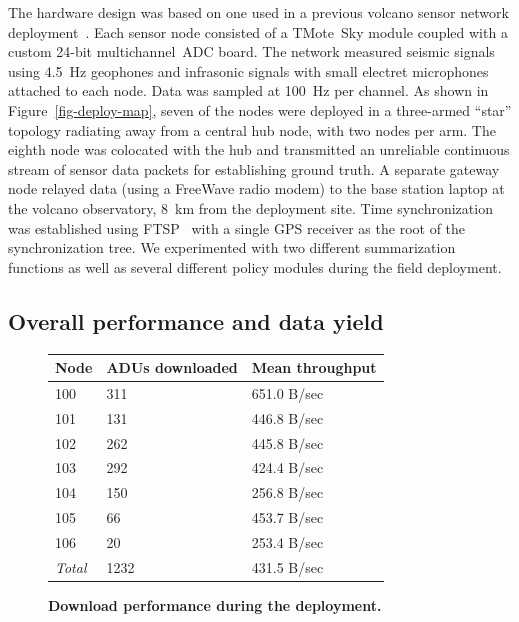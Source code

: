 The hardware design was based on one used in a previous volcano sensor
network deployment~\cite{volcano-osdi06}.
Each sensor node consisted of a TMote~Sky module
coupled with a custom 24-bit multichannel~ADC board. The network measured
seismic signals using 4.5~Hz geophones and infrasonic signals with small
electret microphones attached to each node.  Data was sampled at 100~Hz
per channel. As shown in Figure~\ref{fig-deploy-map}, seven of the nodes 
were deployed in a three-armed ``star'' topology radiating away from 
a central hub node, with two nodes per arm. 
The eighth node was colocated with the hub and 
transmitted an unreliable continuous stream of sensor data packets 
for establishing ground truth. 
A separate gateway node relayed data (using a FreeWave radio modem) 
to the base station laptop at the volcano observatory, 8~km
from the deployment site. Time synchronization was established using
FTSP~\cite{ftsp} with a single GPS receiver as the root of the
synchronization tree. 
We experimented with two different summarization functions as well as
several different policy modules during the field deployment.

\subsection{Overall performance and data yield}



\begin{figure}[t]
\begin{center}
\begin{small}
\begin{tabular}{|l|l|l|} \hline 
{\bf Node}	& {\bf ADUs downloaded} & {\bf Mean throughput} \\ \hline
100 & 311 & 651.0 B/sec \\
101 & 131 & 446.8 B/sec \\
102 & 262 & 445.8 B/sec \\
103 & 292 & 424.4 B/sec \\
104 & 150 & 256.8 B/sec \\
105 & 66 & 453.7 B/sec \\
106 & 20 & 253.4 B/sec \\ \hline
{\em Total} & 1232 & 431.5 B/sec \\ \hline
\end{tabular}
\end{small}
\end{center}
\caption{\small {\bf Download performance during the deployment.}}
\label{fig-deploy-throughput}
\end{figure}

